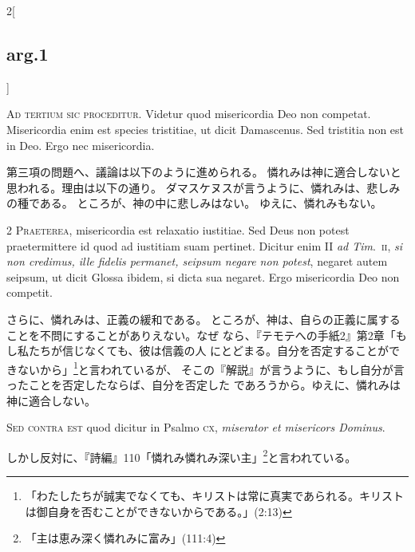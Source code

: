 \documentclass[paper=a4paper,fontsize=10pt,jafontsize=9pt,titlepage]{jlreq}
\begin{document}
\begin{paracol}{2}[\subsection{arg.1}]

{\Huge A}{\scshape d tertium sic proceditur}. Videtur quod
misericordia Deo non competat. Misericordia enim est species tristitiae,
ut dicit Damascenus. Sed tristitia non est in Deo. Ergo nec
misericordia.

\switchcolumn

第三項の問題へ、議論は以下のように進められる。
憐れみは神に適合しないと思われる。理由は以下の通り。
ダマスケヌスが言うように、憐れみは、悲しみの種である。
ところが、神の中に悲しみはない。
ゆえに、憐れみもない。


{\scshape 2 Praeterea}, misericordia est relaxatio
iustitiae. Sed Deus non potest praetermittere id quod ad iustitiam suam
pertinet. Dicitur enim II {\itshape ad Tim}.~{\scshape ii}, {\itshape si non credimus, ille fidelis
permanet, seipsum negare non potest}, negaret autem seipsum, ut dicit
Glossa ibidem, si dicta sua negaret. Ergo misericordia Deo non competit.

\switchcolumn

さらに、憐れみは、正義の緩和である。
ところが、神は、自らの正義に属することを不問にすることがありえない。なぜ
 なら、『テモテへの手紙2』第2章「もし私たちが信じなくても、彼は信義の人
 にとどまる。自分を否定することができないから」\footnote{「わたしたちが誠実でなくても、キリストは常に真実であられる。キリストは御自身を否むことができないからである。」(2:13)}と言われているが、
そこの『解説』が言うように、もし自分が言ったことを否定したならば、自分を否定した
 であろうから。ゆえに、憐れみは神に適合しない。

\switchcolumn*[\subsection{s.c.}]

{\scshape Sed contra est} quod dicitur in Psalmo {\scshape cx},
{\itshape miserator et misericors Dominus}.

\switchcolumn

しかし反対に、『詩編』110「憐れみ憐れみ深い主」\footnote{「主は恵み深く憐れみに富み」(111:4)}と言われている。


\end{paracol}
\end{document}
